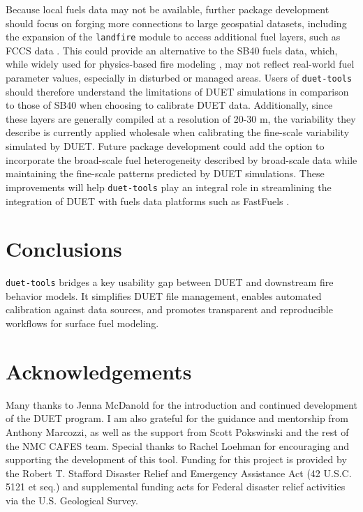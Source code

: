 \documentclass[preprint,12pt,a4paper]{elsarticle}
\begin{document}
Because local fuels data may not be available, further package development should focus on forging more connections to large geospatial datasets, including the expansion of the \texttt{landfire} module to access additional fuel layers, such as FCCS data \cite{ottmar_overview_2007}.
This could provide an alternative to the SB40 fuels data, which, while widely used for physics-based fire modeling \cite{mell_computer_2011, moody_adaptation_2023}, may not reflect real-world fuel parameter values, especially in disturbed or managed areas.
Users of \texttt{duet-tools} should therefore understand the limitations of DUET simulations in comparison to those of SB40 when choosing to calibrate DUET data.
Additionally, since these layers are generally compiled at a resolution of 20-30 m, the variability they describe is currently applied wholesale when calibrating the fine-scale variability simulated by DUET.
Future package development could add the option to incorporate the broad-scale fuel heterogeneity described by broad-scale data while maintaining the fine-scale patterns predicted by DUET simulations.
These improvements will help \texttt{duet-tools} play an integral role in streamlining the integration of DUET with fuels data platforms such as FastFuels \cite{marcozzi_fastfuels_2025}.

\section{Conclusions}
\texttt{duet-tools} bridges a key usability gap between DUET and downstream fire behavior models.
It simplifies DUET file management, enables automated calibration against data sources, and promotes transparent and reproducible workflows for surface fuel modeling.

\section*{Acknowledgements}
Many thanks to Jenna McDanold for the introduction and continued development of the DUET program.
I am also grateful for the guidance and mentorship from Anthony Marcozzi, as well as the support from Scott Pokswinski and the rest of the NMC CAFES team.
Special thanks to Rachel Loehman for encouraging and supporting the development of this tool.
Funding for this project is provided by the Robert T. Stafford Disaster Relief and Emergency Assistance Act (42 U.S.C. 5121 et seq.) and supplemental funding acts for Federal disaster relief activities via the U.S. Geological Survey.



\end{document}

